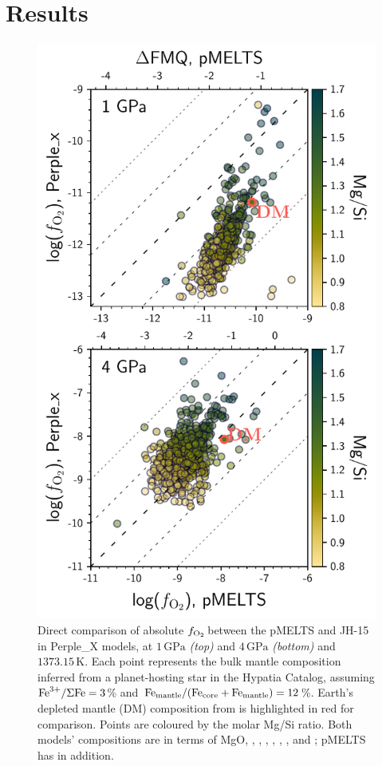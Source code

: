 \documentclass[fleqn,usenatbib,twocolumn]{mnras}
\newcommand{\fo}{$f_{\ce{O2}}$}
\begin{document}
\section{Results}
\label{sec:results}

\begin{figure}
\centering
  \includegraphics[width=1\linewidth]{figs/logfo2_mdls_pressures.pdf}
\caption{\label{fig:model_comp}Direct comparison of absolute \fo\,between the pMELTS and JH-15 in Perple\_X models, at $1\,\text{GPa}$ \textit{(top)} and $4\,\text{GPa}$ \textit{(bottom)} and $1373.15\,\text{K}$. Each point represents the bulk mantle composition inferred from a planet-hosting star in the Hypatia Catalog, assuming ${\rm Fe}^{3+}/\Sigma{\rm Fe} = 3$\% and ${\rm Fe}_{\rm mantle}/({\rm Fe}_{\rm core} + {\rm Fe}_{\rm mantle}) = 12$\%. Earth's depleted mantle (DM) composition from \citet{workman_major_2005} is highlighted in red for comparison. Points are coloured by the molar Mg/Si ratio. Both models' compositions are in terms of MgO, , , , , , , and ; pMELTS has  in addition.}
\end{figure}
\end{document}

